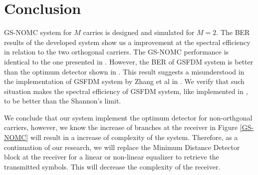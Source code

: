 \documentclass[draftcls,12pt, onecolumn, twoside]{IEEEtran}
\begin{document}
\section{Conclusion}

GS-NOMC system for $M$ carries is designed and simulated for $M=2$. The BER results of the developed system show us a improvement at the spectral efficiency in relation to the two orthogonal carriers. The GS-NOMC performance is identical to the one presented in \cite{Lucena}. However, the BER of GSFDM system is better than the optimum detector shown in \cite{Lucena}. This result suggests a misunderstood in the implementation of GSFDM system by Zhang et al in \cite{Zhang}. We verify that such situation makes the spectral efficiency  of GSFDM system, like implemented in \cite{Zhang},  to be better than the Shannon's limit. 

We conclude that our system implement the optimum detector for non-orthgonal carriers, however, we know the increase of branches at the receiver in Figure \ref{GS-NOMC} will result in a increase of complexity of the system. Therefore, as a continuation of our research,  we will replace the Minimum Distance Detector block at the receiver for a linear or non-linear equalizer to retrieve the transmitted symbols. This will decrease the complexity of the receiver.



%
%
\end{document}
